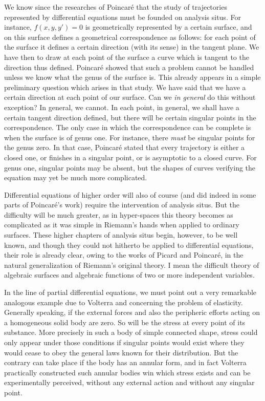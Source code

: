\documentclass[12pt,oneside]{book}
\begin{document}
We know since the researches of Poincar\'e that the study of trajectories
represented by differential equations must be founded on analysis situs. For
instance, $f(x,y,y')=0$ is geometrically represented by a certain surface, and
on this surface defines a geometrical correspondence as follows: for each point
of the surface it defines a certain direction (with its sense) in the tangent
plane. We have then to draw at each point of the surface a curve which is
tangent to the direction thus defined. Poincar\'e showed that such a problem
cannot be handled unless we know what the genus of the surface is. This already
appears in a simple preliminary question which arises in that study. We have said
that we have a certain direction at each point of our surface. Can we \textit{in
general} do this without exception? In general, we cannot. In each point, in
general, we shall have a certain tangent direction defined, but there will be
certain singular points in the correspondence. The only case in which the
correspondence can be complete is when the surface is of genus one. For
instance, there \textit{must} be singular points for the genus zero. In that
case, Poincar\'e stated that every trajectory is either a closed one, or
finishes in a singular point, or is asymptotic to a closed curve. For genus one,
singular points may be absent, but the shapes of curves verifying the equation
may yet be much more complicated. \par

Differential equations of higher order will also of course (and did indeed in
some parts of Poincar\'e's work) require the intervention of analysis situs. But
the difficulty will be much greater, as in hyper-spaces this theory becomes as
complicated as it was simple in Riemann's hands when applied to ordinary
surfaces. These higher chapters of analysis situs begin, however, to be well
known, and though they could not hitherto be applied to differential equations,
their role is already clear, owing to the works of Picard and Poincar\'e, in the
natural generalization of Riemann's original theory. I mean the difficult theory
of algebraic surfaces and algebraic functions of two or more independent
variables. \par

In the line of partial differential equations, we must point out a very
remarkable analogous example due to Volterra and concerning the problem of
elasticity. Generally speaking, if the external forces and also the peripheric
efforts acting on a homogeneous solid body are zero. So will be the stress at
every point of its substance. More precisely in such a body of simple connected
shape, stress could only appear under those conditions if singular points would
exist where they would cease to obey the general laws known for their
distribution. But the contrary can take place if the body has an annular form,
and in fact Volterra practically constructed such annular bodies win which
stress exists and can be experimentally perceived, without any external action
and without any singular point. \par
\end{document}
